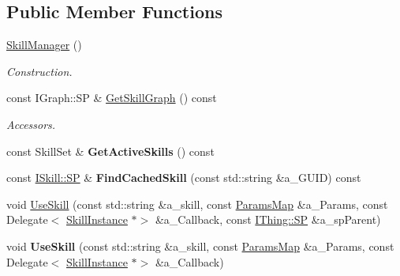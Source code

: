 \subsection*{Public Member Functions}
\begin{DoxyCompactItemize}
\item 
\mbox{\label{class_skill_manager_a88ba520bb439d226bc62b44d10e3a679}} 
\hyperlink{class_skill_manager_a88ba520bb439d226bc62b44d10e3a679}{Skill\+Manager} ()
\begin{DoxyCompactList}\small\item\em Construction. \end{DoxyCompactList}\item 
\mbox{\label{class_skill_manager_a2988694cf9bca6190a3a1d1d32746c8e}} 
const I\+Graph\+::\+SP \& \hyperlink{class_skill_manager_a2988694cf9bca6190a3a1d1d32746c8e}{Get\+Skill\+Graph} () const
\begin{DoxyCompactList}\small\item\em Accessors. \end{DoxyCompactList}\item 
\mbox{\label{class_skill_manager_a2c97daf72840aa1a1be8ffa4a859bac2}} 
const Skill\+Set \& {\bfseries Get\+Active\+Skills} () const
\item 
\mbox{\label{class_skill_manager_a259df4660f96c4fc895e30eb0d359f33}} 
const \hyperlink{class_i_skill_a68bcce999ab0444eebaca3fb8ddb8a31}{I\+Skill\+::\+SP} \& {\bfseries Find\+Cached\+Skill} (const std\+::string \&a\+\_\+\+G\+U\+ID) const
\item 
void \hyperlink{class_skill_manager_a93d4f06cba6013263d249a52d0cd8e8c}{Use\+Skill} (const std\+::string \&a\+\_\+skill, const \hyperlink{class_params_map}{Params\+Map} \&a\+\_\+\+Params, const Delegate$<$ \hyperlink{class_skill_instance}{Skill\+Instance} $\ast$$>$ \&a\+\_\+\+Callback, const \hyperlink{class_i_thing_a6e95654aef6362c48b9a2fd44a1f970a}{I\+Thing\+::\+SP} \&a\+\_\+sp\+Parent)
\item 
\mbox{\label{class_skill_manager_a6b61035d0240c4355dc55aa35825e6c9}} 
void {\bfseries Use\+Skill} (const std\+::string \&a\+\_\+skill, const \hyperlink{class_params_map}{Params\+Map} \&a\+\_\+\+Params, const Delegate$<$ \hyperlink{class_skill_instance}{Skill\+Instance} $\ast$$>$ \&a\+\_\+\+Callback)

\end{DoxyCompactItemize}
